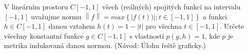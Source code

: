 \subsubsection{}

V lineárním prostoru $C\left [ -1,1 \right ]$ všech (reálných) spojitých funkcí na intervalu $\left [ -1,1 \right ]$ uvažujme normu $\left \| f \right \|=max\left \{ \left | f(t)) \right |;t \in \left [ -1,1 \right ] \right \}$ a funkci $h \in C\left [ -1,1 \right ]$ danou vztahem $h(t) = 1 - \left | t \right |$ pro všechna $ t \in \left [ -1,1 \right ]$. Určete všechny konstantní funkce $g \in C\left [ -1,1 \right ]$ s vlastností $p\left ( g,h \right )=1$, kde $p$ je metrika indukovaná danou normou. (Návod: Úlohu řeště graficky.)
